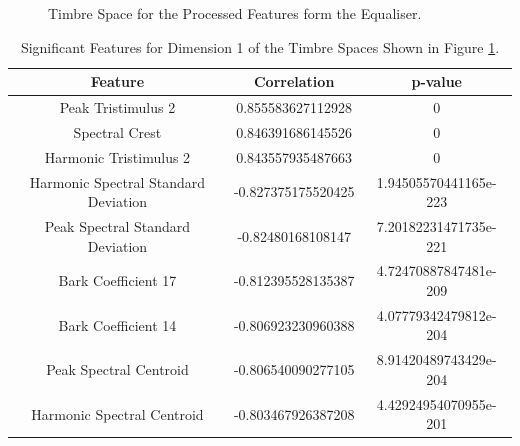 	\begin{figure}[h!]
		\centering
		\qquad
		\caption{Timbre Space for the Processed Features form the Equaliser.}
		\label{fig:EqualiserProcessedMDSs}
	\end{figure}

	\begin{table}[h!]
		\centering
		\begin{tabular}{|c|c|c|}
			\hline
			\bf{Feature} & \bf{Correlation} & \bf{p-value} \\
			\hline
			\hline
			Peak Tristimulus 2 & 0.855583627112928 & 0 \\
			\hline
			Spectral Crest & 0.846391686145526 & 0 \\
			\hline
			Harmonic Tristimulus 2 & 0.843557935487663 & 0 \\
			\hline
			Harmonic Spectral Standard Deviation & -0.827375175520425 & 1.94505570441165e-223 \\
			\hline
			Peak Spectral Standard Deviation & -0.82480168108147 & 7.20182231471735e-221 \\
			\hline
			Bark Coefficient 17 & -0.812395528135387 & 4.72470887847481e-209 \\
			\hline
			Bark Coefficient 14 & -0.806923230960388 & 4.07779342479812e-204 \\
			\hline
			Peak Spectral Centroid & -0.806540090277105 & 8.91420489743429e-204 \\
			\hline
			Harmonic Spectral Centroid & -0.803467926387208 & 4.42924954070955e-201 \\
			\hline
		\end{tabular}
		\caption{Significant Features for Dimension 1 of the Timbre Spaces Shown in Figure 
			 \ref{fig:EqualiserProcessedMDSs}.}
		\label{tab:EqualiserProcessedFeaturesDim1}
	\end{table}

